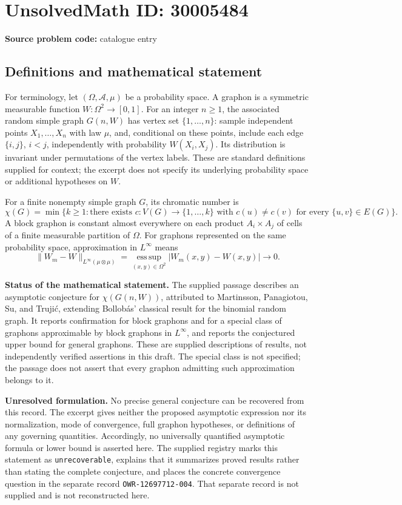 \documentclass[11pt]{article}
\begin{document}
\section*{UnsolvedMath ID: 30005484}
\textbf{Source problem code:} catalogue entry
\subsection{Definitions and mathematical statement}
For terminology, let \((\Omega,\mathcal A,\mu)\) be a probability space. A graphon is a symmetric measurable function \(W:\Omega^2\to[0,1]\). For an integer \(n\geq1\), the associated random simple graph \(G(n,W)\) has vertex set \(\{1,\ldots,n\}\): sample independent points \(X_1,\ldots,X_n\) with law \(\mu\), and, conditional on these points, include each edge \(\{i,j\}\), \(i<j\), independently with probability \(W(X_i,X_j)\). Its distribution is invariant under permutations of the vertex labels. These are standard definitions supplied for context; the excerpt does not specify its underlying probability space or additional hypotheses on \(W\).

For a finite nonempty simple graph \(G\), its chromatic number is
\[
\chi(G)=\min\bigl\{k\geq1:\text{there exists }c:V(G)\to\{1,\ldots,k\}\text{ with }c(u)\neq c(v)\text{ for every }\{u,v\}\in E(G)\bigr\}.
\]
A block graphon is constant almost everywhere on each product \(A_i\times A_j\) of cells of a finite measurable partition of \(\Omega\). For graphons represented on the same probability space, approximation in \(L^\infty\) means
\[
\|W_m-W\|_{L^\infty(\mu\otimes\mu)}
=\operatorname*{ess\,sup}_{(x,y)\in\Omega^2}|W_m(x,y)-W(x,y)|\longrightarrow0.
\]

\textbf{Status of the mathematical statement.} The supplied passage describes an asymptotic conjecture for \(\chi(G(n,W))\), attributed to Martinsson, Panagiotou, Su, and Truji\'{c}, extending Bollob\'{a}s' classical result for the binomial random graph. It reports confirmation for block graphons and for a special class of graphons approximable by block graphons in \(L^\infty\), and reports the conjectured upper bound for general graphons. These are supplied descriptions of results, not independently verified assertions in this draft. The special class is not specified; the passage does not assert that every graphon admitting such approximation belongs to it.

\textbf{Unresolved formulation.} No precise general conjecture can be recovered from this record. The excerpt gives neither the proposed asymptotic expression nor its normalization, mode of convergence, full graphon hypotheses, or definitions of any governing quantities. Accordingly, no universally quantified asymptotic formula or lower bound is asserted here. The supplied registry marks this statement as \texttt{unrecoverable}, explains that it summarizes proved results rather than stating the complete conjecture, and places the concrete convergence question in the separate record \texttt{OWR-12697712-004}. That separate record is not supplied and is not reconstructed here.
\end{document}
